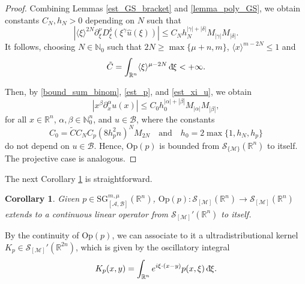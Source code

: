 \documentclass[11pt,reqno]{amsart}
\numberwithin{equation}{section}
\newcommand{\dbar}{\mathrm{d}\hspace*{-0.15em}\bar{}\hspace*{0.1em}}
\newtheorem{corollary}[theorem]{Corollary}
\newcommand{\R}{{\mathbb{R}}} %
\newcommand{\N}{{\mathbb{N}}} %
\newcommand{\caS}{{\mathcal{S}}}
\newcommand{\Op}{{\mathrm{Op}}}
\newcommand{\SG}{{\mathrm{SG}}}
\newcommand{\M}{{\mathcal{M}}} %
\newcommand{\A}{{\mathcal{A}}} %
\newcommand{\B}{{\mathcal{B}}} %
\begin{document}
\begin{proof}
	Combining Lemmas \ref{est_GS_bracket} and \ref{lemma_poly_GS}, we obtain constants $C_N,h_N>0$ depending on $N$ such that
	\begin{equation}\label{est_xi_u}
		|\langle\xi\rangle^{2N}\partial_\xi^\nu D_\xi^\delta (\xi^\gamma\widehat{u}(\xi))| \leq C_Nh_N^{|\gamma|+|\delta|}M_{|\gamma|}M_{|\delta|}.
	\end{equation}
	It follows, choosing $N\in\N_0$ such that $2N\geq \max\{\mu+n,m\}$,
	$\langle x\rangle^{m-2N}\leq 1$ and
	\begin{equation}\label{const_int}
	\tilde C = \int_{\R^n}\langle\xi\rangle^{\mu-2N}\,\dbar\xi<+\infty.
	\end{equation}
	
	Then, by \eqref{bound_sum_binom}, \eqref{est_p}, and \eqref{est_xi_u}, we obtain
	\[|x^\beta\partial_x^\alpha u(x)| \leq C_0h_0^{|\alpha|+|\beta|}M_{|\alpha|}M_{|\beta|},\]
	for all $x\in\R^n$, $\alpha,\beta\in\N_0^n$, and $u\in\mathscr{B}$, where the constants
	\[C_0 = \tilde{C}C_NC_p(8h_p^{2}n)^NM_{2N}\quad\text{and}\quad h_0 = 2\max\{1,h_N,h_p\}\]
	do not depend on $u\in\mathscr{B}$. Hence, $\mathrm{Op}(p)$ is bounded
	from $\caS_{\{\M\}}(\R^n)$ to itself. The projective case is analogous. 
\end{proof}

The next Corollary \ref{cont_SG_ext} is straightforward.

\begin{corollary}\label{cont_SG_ext}
	Given $p\in \SG_{[\A,\B]}^{m,\mu}(\mathbb{R}^n)$, $\mathrm{Op}(p):\mathcal{S}_{[\M]}(\mathbb{R}^n)\to \mathcal{S}_{[\M]}(\mathbb{R}^n)$ extends to a continuous linear operator from $\mathcal{S}_{[\M]}'(\mathbb{R}^n)$ to itself.
\end{corollary}
%
By the continuity of $\Op(p)$, we can associate to it a ultradistributional kernel $K_p\in\caS_{[\M]}'(\R^{2n})$, which is given by the oscillatory integral
%
\[K_p(x,y) = \int_{\R^n} e^{i\xi\cdot(x-y)}p(x,\xi)\,\dbar\xi.\]
%
\end{document}

